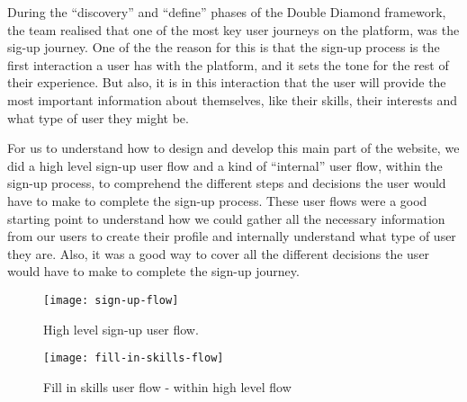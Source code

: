 During the ``discovery'' and ``define'' phases of the Double Diamond framework, the team realised that one of the most key user journeys on the platform, was the sig-up journey.
One of the the reason for this is that the sign-up process is the first interaction a user has with the platform, and it sets the tone for the rest of their experience.
But also, it is in this interaction that the user will provide the most important information about themselves, like their skills, their interests and what type of user they might be.

For us to understand how to design and develop this main part of the website, we did a high level sign-up user flow and a kind of ``internal'' user flow, within the sign-up process, to comprehend the different steps and decisions the user would have to make to complete the sign-up process.
These user flows were a good starting point to understand how we could gather all the necessary information from our users to create their profile and internally understand what type of user they are.
Also, it was a good way to cover all the different decisions the user would have to make to complete the sign-up journey.
\begin{figure}[h]
    \centering
    \texttt{[image: sign-up-flow]}
    \caption{High level sign-up user flow.}
    \label{fig:figure18}
\end{figure}
\newpage
\begin{figure}[h]
    \centering
    \texttt{[image: fill-in-skills-flow]}
    \caption{Fill in skills user flow - within high level flow}
    \label{fig:figure19}
\end{figure}

